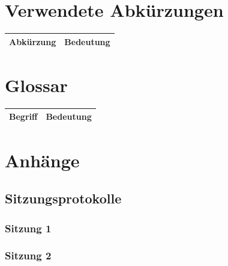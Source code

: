 \documentclass{report}
\begin{document}
\chapter{Verwendete Abkürzungen}
\begin{table}[h!]
    \begin{tabular}{|L{0.3\textwidth}|L{0.6\textwidth}|}
        \hline
         Abkürzung & Bedeutung \\
        \hline
    \end{tabular}
\end{table}

\chapter{Glossar}
\begin{table}[h!]
    \begin{tabular}{|L{0.3\textwidth}|L{0.6\textwidth}|}
        \hline
         Begriff & Bedeutung \\[12pt]
        \hline
    \end{tabular}
\end{table}
\chapter{Anhänge}
\section{Sitzungsprotokolle}
\subsection{Sitzung 1}
\subsection{Sitzung 2}
\end{document}
